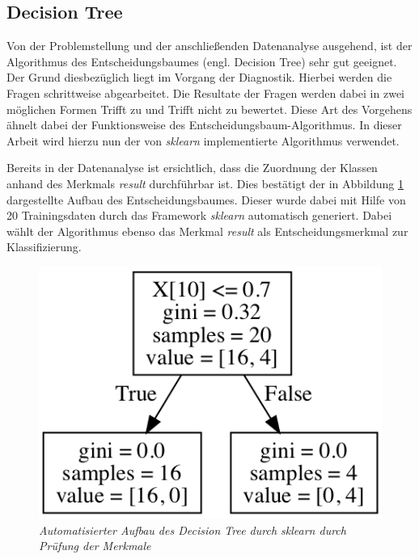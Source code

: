 \subsection{Decision Tree} \label{sec:tree}
Von der Problemstellung und der anschließenden Datenanalyse ausgehend, ist der Algorithmus des Entscheidungsbaumes (engl. \glqq Decision Tree\grqq) sehr gut geeignet. Der Grund diesbezüglich liegt im Vorgang der Diagnostik. Hierbei werden die Fragen schrittweise abgearbeitet. Die Resultate der Fragen werden dabei in zwei möglichen Formen \glqq Trifft zu\grqq{} und \glqq Trifft nicht zu\grqq{} bewertet. Diese Art des Vorgehens ähnelt dabei der Funktionsweise des Entscheidungsbaum-Algorithmus. In dieser Arbeit wird hierzu nun der von \textit{sklearn} implementierte Algorithmus verwendet. %

Bereits in der Datenanalyse ist ersichtlich, dass die Zuordnung der Klassen anhand des Merkmals \textit{result} durchführbar ist. Dies bestätigt der in Abbildung \ref{fig:tree_graph} dargestellte Aufbau des Entscheidungsbaumes. Dieser wurde dabei mit Hilfe von 20 Trainingsdaten durch das Framework \textit{sklearn} automatisch generiert. Dabei wählt der Algorithmus ebenso das Merkmal \textit{result} als Entscheidungsmerkmal zur Klassifizierung.

\begin{figure}[h!]
\centering
\includegraphics[scale=0.7]{graphs/tree_graph.png}
\caption{\em Automatisierter Aufbau des Decision Tree durch \textit{sklearn} durch Prüfung der Merkmale}
\label{fig:tree_graph}
\end{figure}